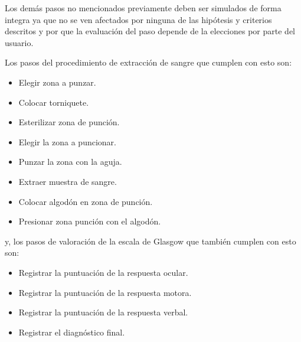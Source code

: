 Los demás pasos no mencionados previamente deben ser simulados de forma 
integra ya que no se ven afectados por ninguna de las hipótesis y criterios descritos 
y por que la evaluación del paso depende de la elecciones por parte del usuario. 

Los pasos del procedimiento de extracción de sangre que cumplen con esto son:
\begin{itemize}
    \item Elegir zona a punzar.
    \item Colocar torniquete.
    \item Esterilizar zona de punción.
    \item Elegir la zona a puncionar.
    \item Punzar la zona con la aguja.
    \item Extraer muestra de sangre.
    \item Colocar algodón en zona de punción.
    \item Presionar zona punción con el algodón.
\end{itemize}

y, los pasos de valoración de la escala de Glasgow que también cumplen con esto son:
\begin{itemize}
    \item Registrar la puntuación de la respuesta ocular.
    \item Registrar la puntuación de la respuesta motora.
    \item Registrar la puntuación de la  respuesta verbal.
    \item Registrar el diagnóstico final.
\end{itemize}







